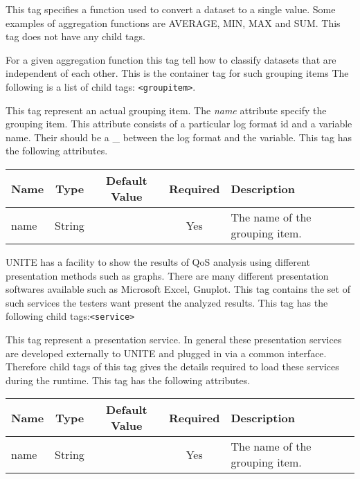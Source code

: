
This tag specifies a function used to convert a dataset to a single 
value. Some examples of aggregation functions are AVERAGE, 
MIN, MAX and SUM. This tag does not have any child tags.


For a given aggregation function this tag tell how to classify 
datasets that are independent of each other. This is the 
container tag for such grouping items
The following is a list of child tags: \texttt{<groupitem>}. 


This tag represent an actual grouping item. The \textit{name} 
attribute specify the grouping item. This attribute consists of 
a particular log format id and a variable name. Their should be a 
\_ between the log format and the variable. This tag has the 
following attributes. 
\begin{table}
 \begin{tabular}{lcccl}
  \hline
  \textbf{Name} & \textbf{Type} & \textbf{Default Value} & \textbf{Required} & \textbf{Description} \\
  \hline
  name & String  & & Yes & The name of the grouping item. \\
  \end{tabular}
\end{table}


UNITE has a facility to show the results of QoS analysis using different 
presentation methods such as graphs. There are many different presentation 
softwares available such as Microsoft Excel, Gnuplot. This tag contains the 
set of such services the testers want present the analyzed results. This tag has 
the following child tags:\texttt{<service>}


This tag represent a presentation service. In general these presentation services 
are developed externally to UNITE and plugged in via a common interface.
Therefore child tags of this tag gives the details required to load these services 
during the runtime. This tag has the following attributes.

\begin{table}
 \begin{tabular}{lcccl}
  \hline
  \textbf{Name} & \textbf{Type} & \textbf{Default Value} & \textbf{Required} & \textbf{Description} \\
  \hline
  name & String  & & Yes & The name of the grouping item. \\
  \end{tabular}
\end{table}

